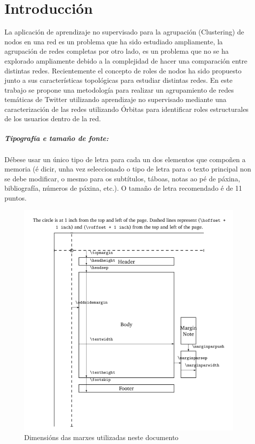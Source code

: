 \chapter{Introducción}
\label{sec:intro}

La aplicación de aprendizaje no supervisado para la agrupación (Clustering) de nodos en una red es un problema que ha sido estudiado ampliamente, la agrupación de redes completas por otro lado, es un problema que no se ha explorado ampliamente debido a la complejidad de hacer una comparación entre distintas redes. Recientemente el concepto de roles de nodos ha sido propuesto junto a sus características topológicas para estudiar distintas redes. En este trabajo se propone una metodología para realizar un agrupamiento de redes temáticas de Twitter utilizando aprendizaje no supervisado mediante una caracterización de las redes utilizando Órbitas para identificar roles estructurales de los usuarios dentro de la red.

\paragraph{Tipografía e tamaño de fonte:} Débese usar un único tipo de letra para cada un dos elementos que compoñen a memoria (é dicir, unha vez seleccionado o tipo de letra para o texto principal non se debe modificar, o mesmo para os subtítulos, táboas, notas ao pé de páxina, bibliografía, números de páxina, etc.). O tamaño de letra recomendado é de 11 puntos. 



\begin{figure}[htbp!]
    \centering
    \includegraphics[width=\textwidth]{graphlet-thesis/images/layout.png}
    \caption{Dimensións das marxes utilizadas neste documento}
    \label{fig:layout}
\end{figure}

